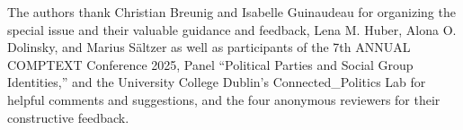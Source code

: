 The authors thank
Christian Breunig and Isabelle Guinaudeau for organizing the special issue and their valuable guidance and feedback,
Lena M. Huber, Alona O. Dolinsky, and Marius Sältzer as well as participants of the 7th ANNUAL COMPTEXT Conference 2025, Panel ``Political Parties and Social Group Identities,'' and the University College Dublin's Connected\_Politics Lab for helpful comments and suggestions,
and
the four anonymous reviewers for their constructive feedback.
